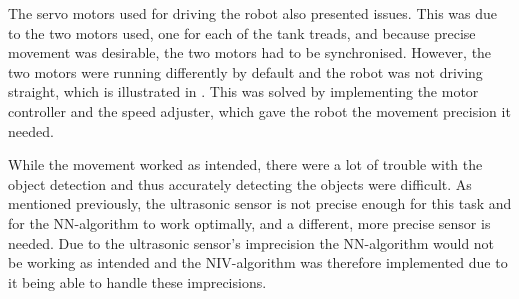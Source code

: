 The servo motors used for driving the robot also presented issues. This was due to the two motors used, one for each of the tank treads, and because precise movement was desirable, the two motors had to be synchronised. However, the two motors were running differently by default and the robot was not driving straight, which is illustrated in . This was solved by implementing the motor controller and the speed adjuster, which gave the robot the movement precision it needed.

While the movement worked as intended, there were a lot of trouble with the object detection and thus accurately detecting the objects were difficult. As mentioned previously, the ultrasonic sensor is not precise enough for this task and for the NN-algorithm to work optimally, and a different, more precise sensor is needed. Due to the ultrasonic sensor's imprecision the NN-algorithm would not be working as intended and the NIV-algorithm was therefore implemented due to it being able to handle these imprecisions.




